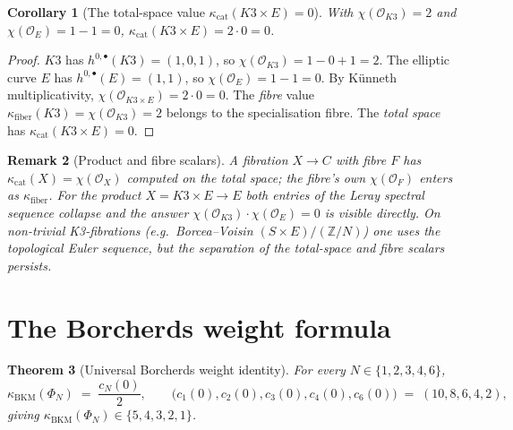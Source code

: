 \documentclass[11pt]{article}
\newtheorem{theorem}{Theorem}[section]
\newtheorem{remark}[theorem]{Remark}
\newtheorem{corollary}[theorem]{Corollary}
\newcommand{\Z}{\mathbb{Z}}
\newcommand{\cO}{\mathcal{O}}
\begin{document}
\begin{corollary}[The total-space value $\kappa_{\mathrm{cat}}(K3\times E)=0$]
\label{cor:categorical-scalar-k3e}
With $\chi(\cO_{K3})=2$ and $\chi(\cO_E)=1-1=0$,
$\kappa_{\mathrm{cat}}(K3\times E)=2\cdot 0=0$.
\end{corollary}

\begin{proof}
$K3$ has $h^{0,\bullet}(K3)=(1,0,1)$, so $\chi(\cO_{K3})=1-0+1=2$.
The elliptic curve $E$ has $h^{0,\bullet}(E)=(1,1)$, so
$\chi(\cO_E)=1-1=0$. By K\"unneth multiplicativity,
$\chi(\cO_{K3\times E})=2\cdot 0=0$. The \emph{fibre} value
$\kappa_{\mathrm{fiber}}(K3)=\chi(\cO_{K3})=2$ belongs to the
specialisation fibre. The \emph{total space} has
$\kappa_{\mathrm{cat}}(K3\times E)=0$.
\end{proof}

\begin{remark}[Product and fibre scalars]
\label{rem:not-its-fibre}
A fibration $X\to C$ with fibre $F$ has
$\kappa_{\mathrm{cat}}(X)=\chi(\cO_X)$ computed on the \emph{total}
space; the fibre's own $\chi(\cO_F)$ enters as
$\kappa_{\mathrm{fiber}}$. For the product $X=K3\times E\to E$
both entries of the Leray spectral sequence collapse and the answer
$\chi(\cO_{K3})\cdot\chi(\cO_E)=0$ is visible directly. On non-trivial
K3-fibrations (e.g.~Borcea--Voisin $(S\times E)/(\Z/N)$) one uses the
topological Euler sequence, but the separation of the total-space and
fibre scalars persists.
\end{remark}

\section{The Borcherds weight formula}
\label{sec:borcherds-weight}

\begin{theorem}[Universal Borcherds weight identity]
\label{thm:universal-borcherds-weight}
For every $N\in\{1,2,3,4,6\}$,
\[
  \kappa_{\mathrm{BKM}}(\Phi_N)
  \;=\;
  \frac{c_N(0)}{2},\qquad
  \bigl(c_1(0),c_2(0),c_3(0),c_4(0),c_6(0)\bigr)\;=\;(10,8,6,4,2),
\]
giving $\kappa_{\mathrm{BKM}}(\Phi_N)\in\{5,4,3,2,1\}$.
\end{theorem}
\end{document}
